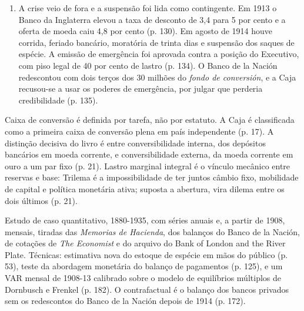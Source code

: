 \begin{enumerate}[leftmargin=*,nosep]
por cento e o risco país estava em 1,5 ponto percentual (p. 129). Ford é citado
para a leitura de que o padrão-ouro amplificava o ciclo na periferia (p. 129).
\item A crise veio de fora e a suspensão foi lida como contingente. Em 1913 o
Banco da Inglaterra elevou a taxa de desconto de 3,4 para 5 por cento e a
oferta de moeda caiu 4,8 por cento (p. 130). Em agosto de 1914 houve corrida,
feriado bancário, moratória de trinta dias e suspensão dos saques de espécie. A
emissão de emergência foi aprovada contra a posição do Executivo, com piso
legal de 40 por cento de lastro (p. 134). O Banco de la Nación redescontou com
dois terços dos 30 milhões do \emph{fondo de conversión}, e a Caja recusou-se a
usar os poderes de emergência, por julgar que perderia credibilidade (p. 135).
\end{enumerate}

Caixa de conversão é definida por tarefa, não por estatuto.
A Caja é classificada como a primeira caixa de conversão plena em país
independente (p. 17). A distinção decisiva do livro é entre conversibilidade
interna, dos depósitos bancários em moeda corrente, e conversibilidade externa,
da moeda corrente em ouro a um par fixo (p. 21). Lastro marginal integral é o
vínculo mecânico entre reservas e base:
Trilema é a impossibilidade de ter juntos câmbio fixo, mobilidade de capital e
política monetária ativa; suposta a abertura, vira dilema entre os dois últimos
(p. 21).

Estudo de caso quantitativo, 1880-1935, com séries anuais e, a partir de 1908,
mensais, tiradas das \emph{Memorias de Hacienda}, dos balanços do Banco de la
Nación, de cotações de \emph{The Economist} e do arquivo do Bank of London and
the River Plate. Técnicas: estimativa nova do estoque de espécie em mãos do
público (p. 53), teste da abordagem monetária do balanço de pagamentos
(p. 125), e um VAR mensal de 1908-13 calibrado sobre o modelo de equilíbrios
múltiplos de Dornbusch e Frenkel (p. 182). O contrafactual é o balanço dos
bancos privados sem os redescontos do Banco de la Nación depois de 1914
(p. 172).

